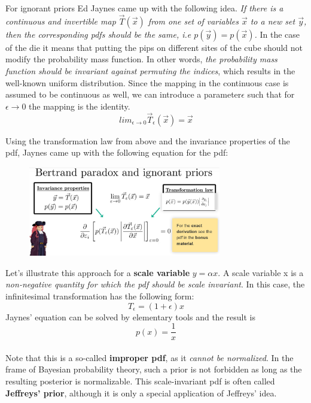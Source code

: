\documentclass[12pt, a4paper]{scrartcl}
\begin{document}
For ignorant priors Ed Jaynes came up with the following idea. \textit{If there is a
continuous and invertible map $\vec{T}(\vec{x})$ from one set of variables $\vec{x}$ to a
new set $\vec{y}$, then the corresponding pdfs should be the same, i.e $p(\vec{y})=p(\vec{x})$.} In the case of the die it
means that putting the pips on diﬀerent sites of the cube should not modify the probability mass function.
In other words, \textit{the probability mass function should be invariant against
permuting the indices}, which results in the well-known uniform distribution.
Since the mapping in the continuous case is assumed to be continuous as
well, we can introduce a parameter$\epsilon$ such that for $\epsilon\rightarrow 0$ the mapping is the
identity. \[lim_{\epsilon\rightarrow 0}\vec{T}_{\epsilon}(\vec{x})=\vec{x}\]

Using the transformation law from above and the invariance properties of
the pdf, Jaynes came up with the following equation for the pdf:%
 \begin{figure}[H]
	\centering
	\includegraphics[width=0.75\textwidth]{8_8.png}
\end{figure}

Let’s illustrate this approach for a \textbf{scale variable} $y=\alpha x$. A scale variable x is a
\textit{non-negative quantity for which the pdf should be scale invariant}. In this case, the inﬁnitesimal transformation has the following form:\[T_{\epsilon}=(1+\epsilon)x\]
Jaynes’ equation can be solved by elementary tools
and the result is 
\begin{equation*}\boxed{p(x)=\frac 1x
}\end{equation*}\\
Note that this is a so-called \textbf{improper pdf}, as it \textit{cannot be normalized}. In the
frame of Bayesian probability theory, such a prior is not forbidden as long as
the resulting posterior is normalizable.
This scale-invariant pdf is often called \textbf{Jeﬀreys’ prior}, although it is only a
special application of Jeﬀreys’ idea.\\
\end{document}
